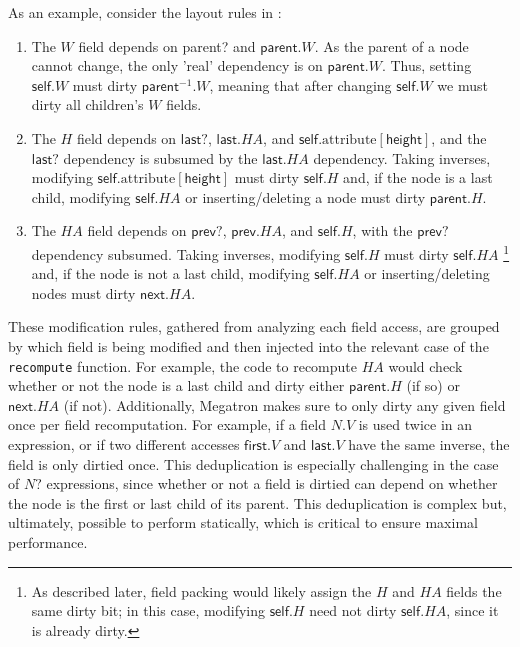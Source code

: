 As an example, consider the layout rules in :
\begin{enumerate}
\item The $W$ field depends on \textsf{parent?} and $\mathsf{parent}.W$.
As the \textsf{parent} of a node cannot change,
  the only 'real' dependency is on $\mathsf{parent}.W$.
Thus, setting $\mathsf{self}.W$ must dirty $\mathsf{parent}^{-1}.W$,
  meaning that after changing $\mathsf{self}.W$
  we must dirty all children's $W$ fields.
\item The $H$ field depends on $\mathsf{last}?$, $\mathsf{last}.HA$,
  and $\mathsf{self}.\text{attribute}[\mathsf{height}]$,
  and the $\mathsf{last}?$ dependency is subsumed by
  the $\mathsf{last}.HA$ dependency.
Taking inverses, modifying $\mathsf{self}.\text{attribute}[\mathsf{height}]$
  must dirty $\mathsf{self}.H$ and,
  if the node is a last child,
  modifying $\mathsf{self}.HA$ or inserting/deleting a node
  must dirty $\mathsf{parent}.H$.
\item The $HA$ field depends on $\mathsf{prev}?$, $\mathsf{prev}.HA$, 
  and $\mathsf{self}.H$, with the $\mathsf{prev}?$ dependency subsumed.
Taking inverses, 
  modifying $\mathsf{self}.H$ must dirty $\mathsf{self}.HA$%
\footnote{
As described later, field packing would likely assign
  the $H$ and $HA$ fields the same dirty bit;
  in this case, modifying $\mathsf{self}.H$
  need not dirty $\mathsf{self}.HA$, since it is already dirty.
}
  and,
  if the node is not a last child,
  modifying $\mathsf{self}.HA$ or inserting/deleting nodes
  must dirty $\mathsf{next}.HA$.
\end{enumerate}

These modification rules, gathered from analyzing each field access,
  are grouped by which field is being modified
  and then injected into the relevant case
  of the \texttt{recompute} function.
For example, the code to recompute $HA$
  would check whether or not the node is a last child
  and dirty either $\mathsf{parent}.H$ (if so)
  or $\mathsf{next}.HA$ (if not).
Additionally,
  Megatron makes sure to only dirty any given field
  once per field recomputation.
For example, if a field $N.V$ is used twice in an expression,
  or if two different accesses $\mathsf{first}.V$ and $\mathsf{last}.V$
  have the same inverse, the field is only dirtied once.
This deduplication is especially challenging
  in the case of $N?$ expressions,
  since whether or not a field is dirtied can depend
  on whether the node is the first or last child of its parent.
This deduplication is complex but, ultimately,
  possible to perform statically,
  which is critical to ensure maximal performance.

